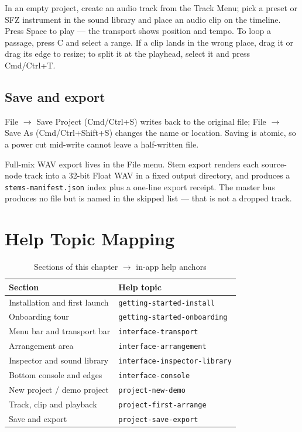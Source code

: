 In an empty project, create an audio track from the Track Menu; pick a preset or SFZ
instrument in the sound library and place an audio clip on the timeline. Press Space to
play — the transport shows position and tempo. To loop a passage, press C and select a
range. If a clip lands in the wrong place, drag it or drag its edge to resize; to split
it at the playhead, select it and press Cmd/Ctrl+T.


\subsection{Save and export}

File $\to$ Save Project (Cmd/Ctrl+S) writes back to the original file;
File $\to$ Save As (Cmd/Ctrl+Shift+S) changes the name or location. Saving is atomic,
so a power cut mid-write cannot leave a half-written file.

Full-mix WAV export lives in the File menu. Stem export renders each source-node track
into a 32-bit Float WAV in a fixed output directory, and produces a
\texttt{stems-manifest.json} index plus a one-line export receipt. The master bus
produces no file but is named in the skipped list — that is not a dropped track.


\section{Help Topic Mapping}

\begin{table}[htbp]
\centering
\caption{Sections of this chapter $\to$ in-app help anchors}
\label{tab:ch01-help}
\begin{tabular}{ll}
\hline
Section & Help topic \\
\hline
Installation and first launch & \texttt{getting-started-install} \\
Onboarding tour & \texttt{getting-started-onboarding} \\
Menu bar and transport bar & \texttt{interface-transport} \\
Arrangement area & \texttt{interface-arrangement} \\
Inspector and sound library & \texttt{interface-inspector-library} \\
Bottom console and edges & \texttt{interface-console} \\
New project / demo project & \texttt{project-new-demo} \\
Track, clip and playback & \texttt{project-first-arrange} \\
Save and export & \texttt{project-save-export} \\
\hline
\end{tabular}
\end{table}

